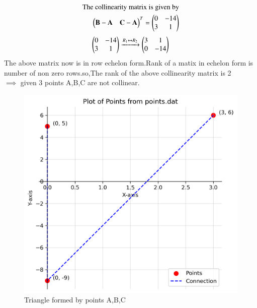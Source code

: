 \documentclass[journal]{IEEEtran}
\begin{document}
\begin{align}
\text{The collinearity matrix is given by}\\
\myvec{
   \vec{B}-\vec{A} & \vec{C}-\vec{A}
 }^T = \myvec{
   0 & -14 
   \\
   3 & 1
   }\\
\end{align}
\begin{align}
    \myvec{
   0 & -14 
   \\
   3 & 1
   }
  &\xrightarrow{R_1 \leftrightarrow R_2}
   \myvec{
   3 & 1
   \\
   0 & -14
   }\\
 \end{align}
 The above matrix now is in row echelon form.Rank of a matix in echelon form is number of non zero rows.so,The rank of the above collinearity matrix is 2\\
 $\implies$ given 3 points A,B,C are not collinear.
 \begin{figure}[h!]
   \centering
   \includegraphics[width=0.5\linewidth]{figs/01.png}
   \caption{Triangle formed by points A,B,C}
   \label{}
\end{figure}
\end{document}
